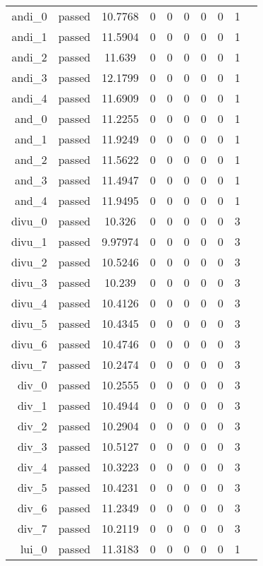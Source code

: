 \begin{longtable}{r|ccccccccc}
    andi\_0 & passed & 10.7768 & 0 & 0 & 0 & 0 & 0 & 1 \\
    andi\_1 & passed & 11.5904 & 0 & 0 & 0 & 0 & 0 & 1 \\
    andi\_2 & passed & 11.639 & 0 & 0 & 0 & 0 & 0 & 1 \\
    andi\_3 & passed & 12.1799 & 0 & 0 & 0 & 0 & 0 & 1 \\
    andi\_4 & passed & 11.6909 & 0 & 0 & 0 & 0 & 0 & 1 \\
    and\_0 & passed & 11.2255 & 0 & 0 & 0 & 0 & 0 & 1 \\
    and\_1 & passed & 11.9249 & 0 & 0 & 0 & 0 & 0 & 1 \\
    and\_2 & passed & 11.5622 & 0 & 0 & 0 & 0 & 0 & 1 \\
    and\_3 & passed & 11.4947 & 0 & 0 & 0 & 0 & 0 & 1 \\
    and\_4 & passed & 11.9495 & 0 & 0 & 0 & 0 & 0 & 1 \\
    divu\_0 & passed & 10.326 & 0 & 0 & 0 & 0 & 0 & 3 \\
    divu\_1 & passed & 9.97974 & 0 & 0 & 0 & 0 & 0 & 3 \\
    divu\_2 & passed & 10.5246 & 0 & 0 & 0 & 0 & 0 & 3 \\
    divu\_3 & passed & 10.239 & 0 & 0 & 0 & 0 & 0 & 3 \\
    divu\_4 & passed & 10.4126 & 0 & 0 & 0 & 0 & 0 & 3 \\
    divu\_5 & passed & 10.4345 & 0 & 0 & 0 & 0 & 0 & 3 \\
    divu\_6 & passed & 10.4746 & 0 & 0 & 0 & 0 & 0 & 3 \\
    divu\_7 & passed & 10.2474 & 0 & 0 & 0 & 0 & 0 & 3 \\
    div\_0 & passed & 10.2555 & 0 & 0 & 0 & 0 & 0 & 3 \\
    div\_1 & passed & 10.4944 & 0 & 0 & 0 & 0 & 0 & 3 \\
    div\_2 & passed & 10.2904 & 0 & 0 & 0 & 0 & 0 & 3 \\
    div\_3 & passed & 10.5127 & 0 & 0 & 0 & 0 & 0 & 3 \\
    div\_4 & passed & 10.3223 & 0 & 0 & 0 & 0 & 0 & 3 \\
    div\_5 & passed & 10.4231 & 0 & 0 & 0 & 0 & 0 & 3 \\
    div\_6 & passed & 11.2349 & 0 & 0 & 0 & 0 & 0 & 3 \\
    div\_7 & passed & 10.2119 & 0 & 0 & 0 & 0 & 0 & 3 \\
    lui\_0 & passed & 11.3183 & 0 & 0 & 0 & 0 & 0 & 1 \\

\end{longtable}
